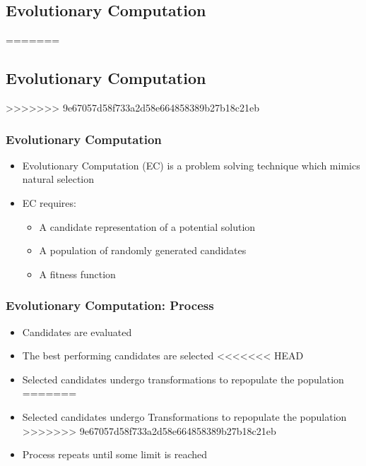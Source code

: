 \documentclass{beamer}
\begin{document}
	\subsection{Evolutionary Computation}
\begin{frame}
=======
	\subsection{Evolutionary Computation}
\begin{frame}
>>>>>>> 9e67057d58f733a2d58e664858389b27b18c21eb
\frametitle{Evolutionary Computation}
 \begin{itemize}
\item Evolutionary Computation (EC) is a problem solving technique which mimics natural selection
\item EC requires:
\begin{itemize}
  \item A candidate representation of a potential solution
  \item A population of randomly generated candidates
  \item A fitness function
\end{itemize}
  \end{itemize}
\end{frame}

\begin{frame}
\frametitle{Evolutionary Computation: Process}
 \begin{itemize}
  \item Candidates are evaluated
  \item The best performing candidates are selected
<<<<<<< HEAD
  \item Selected candidates undergo transformations to repopulate the population
=======
  \item Selected candidates undergo Transformations to repopulate the population
>>>>>>> 9e67057d58f733a2d58e664858389b27b18c21eb
  \item Process repeats until some limit is reached
\end{itemize}
\end{frame}



\end{frame}
\end{document}
